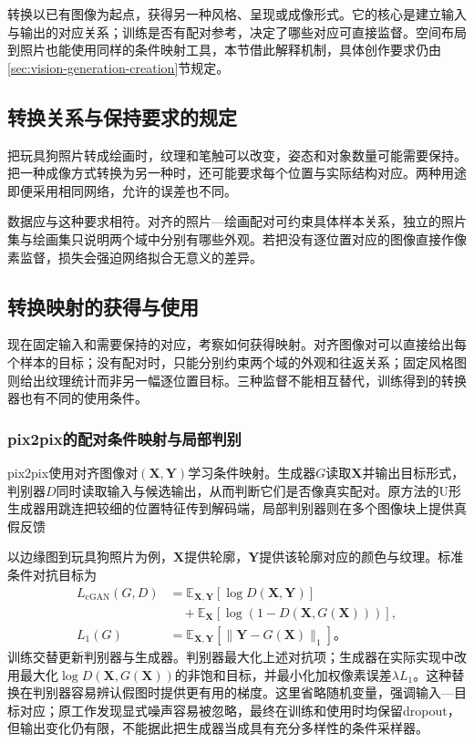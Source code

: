转换以已有图像为起点，获得另一种风格、呈现或成像形式。它的核心是建立输入与输出的对应关系；训练是否有配对参考，决定了哪些对应可直接监督。空间布局到照片也能使用同样的条件映射工具，本节借此解释机制，具体创作要求仍由\ref{sec:vision-generation-creation}节规定。

\subsection{转换关系与保持要求的规定}
\label{sec:vision-generation-translation-requirements}

把玩具狗照片转成绘画时，纹理和笔触可以改变，姿态和对象数量可能需要保持。把一种成像方式转换为另一种时，还可能要求每个位置与实际结构对应。两种用途即便采用相同网络，允许的误差也不同。

数据应与这种要求相符。对齐的照片—绘画配对可约束具体样本关系，独立的照片集与绘画集只说明两个域中分别有哪些外观。若把没有逐位置对应的图像直接作像素监督，损失会强迫网络拟合无意义的差异。

\subsection{转换映射的获得与使用}
\label{sec:vision-generation-translation-mapping}

现在固定输入和需要保持的对应，考察如何获得映射。对齐图像对可以直接给出每个样本的目标；没有配对时，只能分别约束两个域的外观和往返关系；固定风格图则给出纹理统计而非另一幅逐位置目标。三种监督不能相互替代，训练得到的转换器也有不同的使用条件。

\subsubsection{pix2pix的配对条件映射与局部判别}
\label{sec:vision-generation-pix2pix}

pix2pix使用对齐图像对$(\bm{X},\bm{Y})$学习条件映射。生成器$G$读取$\bm{X}$并输出目标形式，判别器$D$同时读取输入与候选输出，从而判断它们是否像真实配对。原方法的U形生成器用跳连把较细的位置特征传到解码端，局部判别器则在多个图像块上提供真假反馈

以边缘图到玩具狗照片为例，$\bm{X}$提供轮廓，$\bm{Y}$提供该轮廓对应的颜色与纹理。标准条件对抗目标为
\begin{equation}
 \begin{aligned}
 L_{\mathrm{cGAN}}(G,D)
 &=\mathbb{E}_{\bm{X},\bm{Y}}[\log D(\bm{X},\bm{Y})]\\
 &\quad+\mathbb{E}_{\bm{X}}[
       \log(1-D(\bm{X},G(\bm{X})))],\\
 L_1(G)&=\mathbb{E}_{\bm{X},\bm{Y}}
       [\lVert\bm{Y}-G(\bm{X})\rVert_1]\text{。}
 \end{aligned}
 \label{eq:vision-pix2pix}
\end{equation}
训练交替更新判别器与生成器。判别器最大化上述对抗项；生成器在实际实现中改用最大化$\log D(\bm{X},G(\bm{X}))$的非饱和目标，并最小化加权像素误差$\lambda L_1$。这种替换在判别器容易辨认假图时提供更有用的梯度。这里省略随机变量，强调输入—目标对应；原工作发现显式噪声容易被忽略，最终在训练和使用时均保留dropout，但输出变化仍有限，不能据此把生成器当成具有充分多样性的条件采样器。

